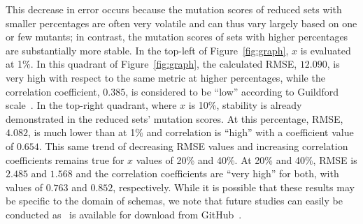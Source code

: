 This decrease in error occurs because the mutation scores of reduced sets with smaller percentages are often very volatile and can
thus vary largely based on one or few mutants; in contrast, the mutation scores of sets with higher percentages are substantially
more stable. In the top-left of Figure~\ref{fig:graph}, $x$ is evaluated at 1\%.  In this quadrant of Figure~\ref{fig:graph}, the
calculated RMSE, $12.090$, is very high with respect to the same metric at higher percentages, while the correlation coefficient,
$0.385$, is considered to be ``low'' according to Guildford scale~\cite{inozemtseva2014coverage}. In the top-right quadrant, where
$x$ is 10\%, stability is already demonstrated in the reduced sets' mutation scores. At this percentage, RMSE, $4.082$, is much lower
than at 1\% and correlation is ``high'' with a coefficient value of $0.654$. This same trend of decreasing RMSE values and increasing
correlation coefficients remains true for $x$ values of 20\% and 40\%. At 20\% and 40\%, RMSE is $2.485$ and $1.568$ and the correlation
coefficients are ``very high'' for both, with values of $0.763$ and $0.852$, respectively. While it is possible that these results may
be specific to the domain of schemas, we note that future studies can easily be conducted as \mr~is available for download from
GitHub~\cite{tool}.


